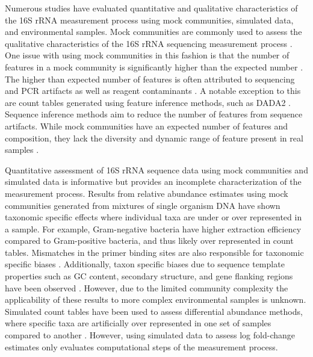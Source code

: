 \documentclass{bmcart}
\begin{document}
Numerous studies have evaluated quantitative and qualitative
characteristics of the 16S rRNA measurement process using mock
communities, simulated data, and environmental samples.
Mock communities are commonly used to assess the qualitative
characteristics of the 16S rRNA sequencing measurement process
\cite{bokulich2016mockrobiota}. One issue with using mock communities
in this fashion is that the number of features in a mock
community is significantly higher than the expected number
\cite{Kopylova2014}. The higher than expected number of features is
often attributed to sequencing and PCR artifacts as well as reagent
contaminants \cite{brooks2015truth, Huse2010}. A notable exception to
this are count tables generated using feature inference methods,
such as DADA2 \cite{callahan2016dada2}. Sequence
inference methods aim to reduce the number of features from sequence artifacts.
While mock communities have an expected number of features and
composition, they lack the diversity and dynamic range of feature
present in real samples \cite{bokulich2016mockrobiota}.

Quantitative assessment of 16S rRNA sequence data using mock communities and
simulated data is informative but provides an
incomplete characterization of the measurement process.
Results from relative abundance estimates using mock communities generated from
mixtures of single organism DNA have shown taxonomic specific effects
where individual taxa are under or over represented in a sample. For
example, Gram-negative bacteria have higher extraction efficiency
compared to Gram-positive bacteria, and thus likely over represented
in count tables\cite{Costea2017, Olson2012}.
Mismatches in the primer binding sites are also responsible for
taxonomic specific biases
\cite{brooks2015truth, klindworth2012evaluation, Gohl2016}.
Additionally, taxon specific biases due to sequence template properties
such as GC content, secondary structure, and gene flanking regions have
been observed \cite{Pinto2012, Hansen1998, Gohl2016}.
However, due to the limited community complexity the applicability of
these results to more complex environmental samples is unknown. Simulated count
tables have been used to assess differential abundance methods, where specific taxa are
artificially over represented in one set of samples compared to another
\cite{McMurdie2014}. However, using simulated data to assess log fold-change
estimates only evaluates computational steps of the measurement process.
\end{document}

